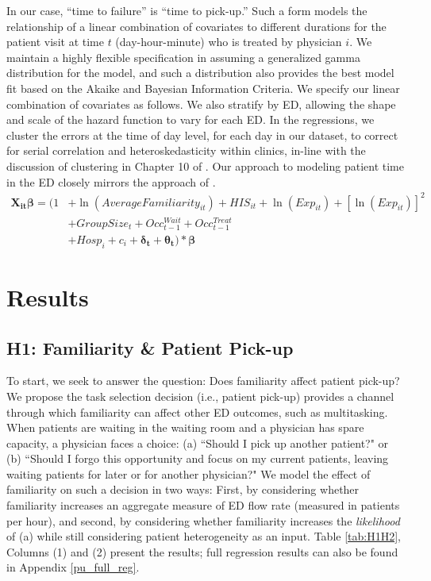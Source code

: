  In our case, “time to failure” is “time to pick-up.” Such a form models the relationship of a linear combination of covariates to different durations for the patient visit at time $t$ (day-hour-minute) who is treated by physician $i$. We maintain a highly flexible specification in assuming a generalized gamma distribution for the model, and such a distribution also provides the best model fit based on the Akaike and Bayesian Information Criteria. We specify our linear combination of covariates as follows. We also stratify by ED, allowing the shape and scale of the hazard function to vary for each ED. In the regressions, we cluster the errors at the time of day level, for each day in our dataset, to correct for serial correlation and heteroskedasticity within clinics, in-line with the discussion of clustering in Chapter 10 of \cite{Cleves2016}. Our approach to modeling patient time in the ED closely mirrors the approach of \cite{Batt2017}.
  \begin{equation} \begin{split} %
        \boldsymbol{X_{it}}\boldsymbol{\beta} = (1 & + \ln(AverageFamiliarity_{it}) + HIS_{it} + \ln(Exp_{it}) + [\ln(Exp_{it})]^2 \\
        & + GroupSize_t + Occ_{t-1}^{Wait} + Occ_{t-1}^{Treat}   \\
        & + Hosp_i + c_i + \boldsymbol{\delta_t} + \boldsymbol{\theta_t} ) * \boldsymbol{\beta}
  \end{split}  \end{equation}
  
  
\section{Results} \label{Results_PU}
 \subsection{H1: Familiarity \& Patient Pick-up} \label{results_H1}
 To start, we seek to answer the question: Does familiarity affect patient pick-up? We propose the task selection decision (i.e., patient pick-up) provides a channel through which familiarity can affect other ED outcomes, such as multitasking. When patients are waiting in the waiting room and a physician has spare capacity, a physician faces a choice: (a) “Should I pick up another patient?" or (b) “Should I forgo this opportunity and focus on my current patients, leaving waiting patients for later or for another physician?" We model the effect of familiarity on such a decision in two ways: First, by considering whether familiarity increases an aggregate measure of ED flow rate (measured in patients per hour), and second, by considering whether familiarity increases the \textit{likelihood} of (a) while still considering patient heterogeneity as an input. Table \ref{tab:H1H2}, Columns (1) and (2) present the results; full regression results can also be found in Appendix \ref{pu_full_reg}. 
 
